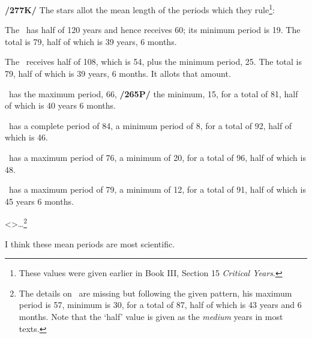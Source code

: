 \textbf{/277K/} The stars allot the mean length of the periods which they rule\footnote{These values were given earlier in Book III, Section 15 \textsl{Critical Years}.}: 

The \Sun\, has half of 120 years and hence receives 60; its minimum period is 19. The total is 79, half of which is 39 years, 6 months.

The \Moon\, receives half of 108, which is 54, plus the minimum period, 25. The total is 79, half of which is 39 years, 6 months. It allots that amount. 

\Mars\, has the maximum period, 66, \textbf{/265P/} the minimum, 15, for a total of 81, half of which is 40 years 6 months.

\Venus\, has a complete period of 84, a minimum period of 8, for a total of 92, half of which is 46.

\Mercury\, has a maximum period of 76, a minimum of 20, for a total of 96, half of which is 48.

\Jupiter\, has a maximum period of 79, a minimum of 12, for a total of 91, half of which is 45 years 6 months.

<\Saturn>…\footnote{The details on \Saturn\, are missing but following the given pattern, his maximum period is 57, minimum is 30, for a total of 87, half of which is 43 years and 6 months. Note that the `half' value is given as the \textit{medium} years in most texts.}

I think these mean periods are most scientific.

\newpage